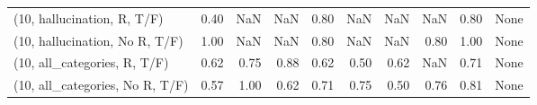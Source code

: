 \begin{table*}[h!]
\begin{adjustbox}{width=2\columnwidth,center}
\begin{tabular}{lrrr|rrr|rrr}
(10, hallucination, R, T/F)           &                      0.40 &                   NaN &                       NaN &                          0.80 &                       NaN &                           NaN &                                    NaN &                               0.80 &                                  None \\
(10, hallucination, No R, T/F)        &                      1.00 &                   NaN &                       NaN &                          0.80 &                       NaN &                           NaN &                                   0.80 &                               1.00 &                                  None \\
(10, all\_categories, R, T/F)          &                      0.62 &                  0.75 &                      0.88 &                          0.62 &                      0.50 &                          0.62 &                                    NaN &                               0.71 &                                  None \\
(10, all\_categories, No R, T/F)       &                      0.57 &                  1.00 &                      0.62 &                          0.71 &                      0.75 &                          0.50 &                                   0.76 &                               0.81 &                                  None \\




\end{tabular}
\end{adjustbox}
\end{table*}

